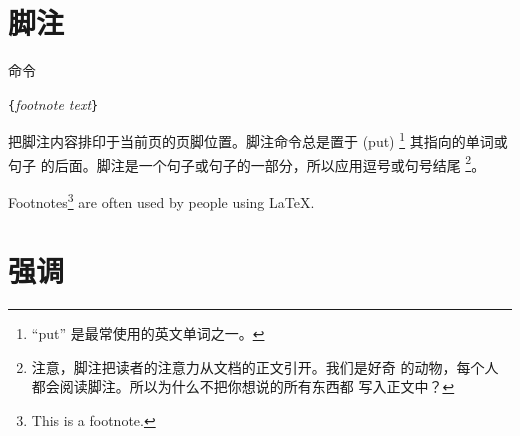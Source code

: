 \section{脚注}
命令
\begin{lscommand}
\verb|{|\emph{footnote text}\verb|}|
\end{lscommand}
\noindent 把脚注内容排印于当前页的页脚位置。脚注命令总是置于 (put)
\footnote{``put'' 是最常使用的英文单词之一。} 其指向的单词或句子
的后面。脚注是一个句子或句子的一部分，所以应用逗号或句号结尾
\footnote{注意，脚注把读者的注意力从文档的正文引开。我们是好奇
的动物，每个人都会阅读脚注。所以为什么不把你想说的所有东西都
写入正文中？\footnotemark}。 


\begin{example}
Footnotes\footnote{This is
  a footnote.} are often used
by people using \LaTeX.
\end{example}
%
\section{强调}

